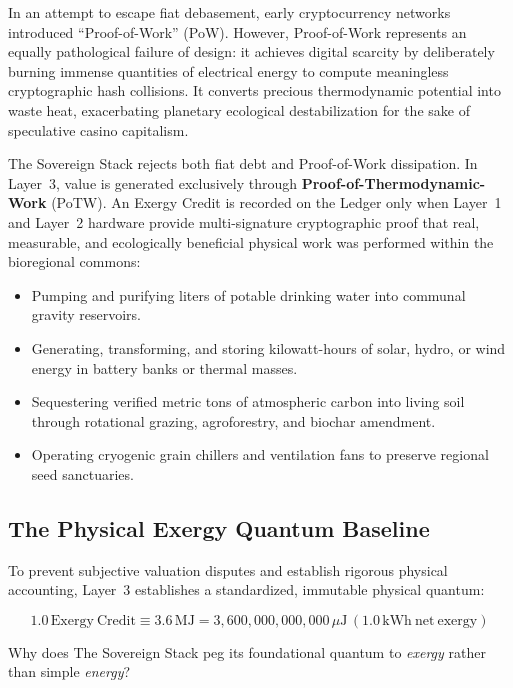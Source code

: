 In an attempt to escape fiat debasement, early cryptocurrency networks introduced ``Proof-of-Work'' (PoW). However, Proof-of-Work represents an equally pathological failure of design: it achieves digital scarcity by deliberately burning immense quantities of electrical energy to compute meaningless cryptographic hash collisions. It converts precious thermodynamic potential into waste heat, exacerbating planetary ecological destabilization for the sake of speculative casino capitalism.

The Sovereign Stack rejects both fiat debt and Proof-of-Work dissipation. In Layer~3, value is generated exclusively through \textbf{Proof-of-Thermodynamic-Work} (PoTW). An Exergy Credit is recorded on the Ledger only when Layer~1 and Layer~2 hardware provide multi-signature cryptographic proof that real, measurable, and ecologically beneficial physical work was performed within the bioregional commons:

\begin{itemize}
  \item Pumping and purifying liters of potable drinking water into communal gravity reservoirs.
  \item Generating, transforming, and storing kilowatt-hours of solar, hydro, or wind energy in battery banks or thermal masses.
  \item Sequestering verified metric tons of atmospheric carbon into living soil through rotational grazing, agroforestry, and biochar amendment.
  \item Operating cryogenic grain chillers and ventilation fans to preserve regional seed sanctuaries.
\end{itemize}

\subsection{The Physical Exergy Quantum Baseline}

To prevent subjective valuation disputes and establish rigorous physical accounting, Layer~3 establishes a standardized, immutable physical quantum:

\begin{equation}
1.0\,\mathrm{Exergy~Credit} \equiv 3.6\,\mathrm{MJ} = 3{,}600{,}000{,}000{,}000\,\mu\mathrm{J}\,(1.0\,\mathrm{kWh~net~exergy})
\label{eq:ch4_quantum}
\end{equation}

Why does The Sovereign Stack peg its foundational quantum to \textit{exergy} rather than simple \textit{energy}?

